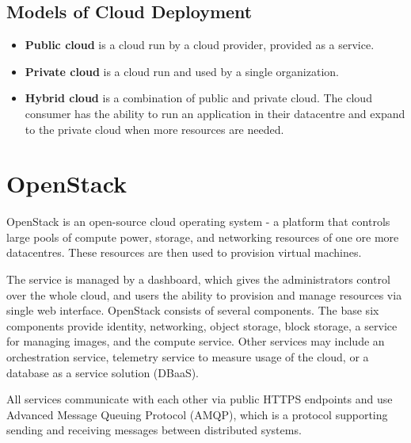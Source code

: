 \subsection{Models of Cloud Deployment}
\begin{itemize}
  \item{\textbf{Public cloud} is a cloud run by a cloud provider, provided as a service.}
  \item{\textbf{Private cloud} is a cloud run and used by a single organization.}
  \item{\textbf{Hybrid cloud} is a combination of public and private cloud. The cloud consumer has the ability} to run an application in their datacentre and expand to the private cloud when more resources are needed.
  \\ \cite{CL210}
\end{itemize}


\section{OpenStack}
OpenStack is an open-source cloud operating system - a platform that controls large pools of compute power, storage, and networking resources of one ore more datacentres. These resources are then used to provision virtual machines.

The service is managed by a dashboard, which gives the administrators control over the whole cloud, and users the ability to provision and manage resources via single web interface.
OpenStack consists of several components. The base six components provide identity, networking, object storage, block storage, a service for managing images, and the compute service. Other services may include an orchestration service, telemetry service to measure usage of the cloud, or a database as a service solution (DBaaS).

All services communicate with each other via public HTTPS endpoints and use Advanced Message Queuing Protocol (AMQP), which is a protocol supporting sending and receiving messages between distributed systems. \cite{CL210}

